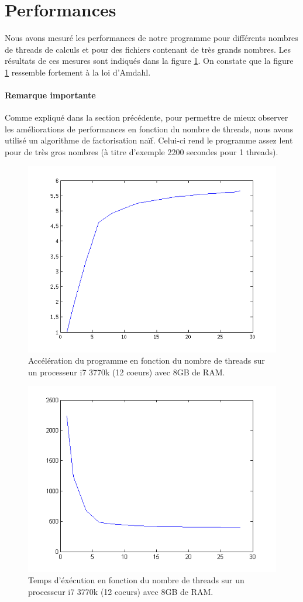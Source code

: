 \documentclass{article}
\begin{document}
\section{Performances}
Nous avons mesuré les performances de notre programme pour différents nombres
de threads de calculs et pour des fichiers contenant de très grands nombres.
Les résultats de ces mesures sont indiqués dans la figure \ref{fig:speedup}.
On constate que la figure \ref{fig:speedup} ressemble fortement à la loi d'Amdahl.

\paragraph{Remarque importante}
Comme expliqué dans la section précédente, pour permettre de mieux observer
les améliorations de performances en fonction du nombre de threads, nous avons
utilisé un algorithme de factorisation naïf. Celui-ci rend le programme assez
lent pour de très gros nombres (à titre d'exemple 2200 secondes pour 1 threads).

\begin{figure}[ht]
	\centering
	\includegraphics[scale=0.8]{img/speedup.png}
	\caption{Accélération du programme en fonction du nombre de threads sur un processeur i7 3770k (12 coeurs)
	avec 8GB de RAM.}
	\label{fig:speedup}
\end{figure}

\begin{figure}[ht]
	\centering
	\includegraphics[scale=0.8]{img/time.png}
	\caption{Temps d'éxécution en fonction du nombre de threads sur un processeur i7 3770k (12 coeurs)
	avec 8GB de RAM.}
	\label{fig:time}
\end{figure}
\end{document}
